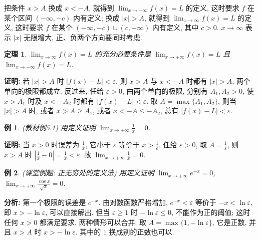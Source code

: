 \documentclass[UTF8,openany]{ctexbook}
\theoremstyle{chinesetextbook}
\newtheorem{example}{例}[section]
\newtheorem{theorem}{定理}[section]
\newenvironment{cnproof}{\par\indent\textbf{证明:} \ignorespaces}{\par}
\begin{document}
把条件 $x>A$ 换成 $x<-A$, 就得到 $\displaystyle\lim_{x\to-\infty}f(x)=L$ 的定义, 这时要求 $f$ 在某个区间 $(-\infty,-c)$ 内有定义; 换成 $|x|>A$, 就得到 $\displaystyle\lim_{x\to\infty}f(x)=L$ 的定义, 这时要求 $f$ 在某个 $(-\infty,-c)\cup(c,+\infty)$ 内有定义, 其中 $c>0$. $x\to\infty$ 表示 $|x|$ 无限增大, 正、负两个方向要同时考虑.
\begin{theorem}
$\displaystyle\lim_{x\to\infty}f(x)=L$ 的充分必要条件是 $\displaystyle\lim_{x\to+\infty}f(x)=L$ 且 $\displaystyle\lim_{x\to-\infty}f(x)=L$.
\end{theorem}
\begin{cnproof}
若 $|x|>A$ 时 $|f(x)-L|<\varepsilon$, 则 $x>A$ 与 $x<-A$ 时都有 $|x|>A$, 两个单向的极限都成立. 反过来, 任给 $\varepsilon>0$, 由两个单向的极限, 分别有 $A_1,A_2>0$, 使 $x>A_1$ 时及 $x<-A_2$ 时都有 $|f(x)-L|<\varepsilon$. 取 $A=\max\{A_1,A_2\}$, 则当 $|x|>A$ 时, 或者 $x>A\ge A_1$, 或者 $x<-A\le-A_2$, 总有 $|f(x)-L|<\varepsilon$.
\end{cnproof}
\begin{example}
\textnormal{(教材例5.1)} 用定义证明 $\displaystyle\lim_{x\to+\infty}\frac1x=0$.
\end{example}
\begin{cnproof}
当 $x>0$ 时误差为 $\displaystyle\frac1x$, 它小于 $\varepsilon$ 等价于 $\displaystyle x>\frac1\varepsilon$. 任给 $\varepsilon>0$, 取 $\displaystyle A=\frac1\varepsilon$, 则 $x>A$ 时 $\displaystyle\left|\frac1x-0\right|=\frac1x<\varepsilon$. 故 $\displaystyle\lim_{x\to+\infty}\frac1x=0$.
\end{cnproof}
\begin{example}
\textnormal{(课堂例题: 正无穷处的定义法)} 用定义证明 $\displaystyle\lim_{x\to+\infty}e^{-x}=0$, $\displaystyle\lim_{x\to+\infty}\frac{\cos x}{\sqrt x}=0$.
\end{example}
\par\indent\textbf{分析:} 第一个极限的误差是 $e^{-x}$. 由对数函数严格增加, $e^{-x}<\varepsilon$ 等价于 $-x<\ln\varepsilon$, 即 $x>-\ln\varepsilon$, 可以直接解出. 但当 $\varepsilon\ge1$ 时 $-\ln\varepsilon\le0$, 不能作为正的阈值; 这时任何 $x>0$ 都满足要求. 两种情形可以合并: 取 $A=\max\{1,-\ln\varepsilon\}$, 它是正数, 并且 $x>A$ 时 $x>-\ln\varepsilon$. 其中的 $1$ 换成别的正数也可以.
\end{document}
